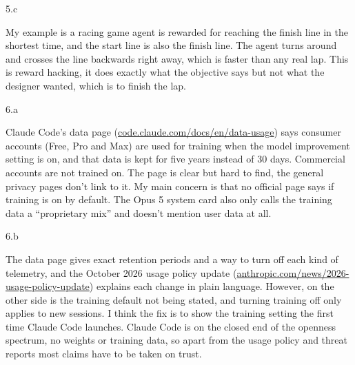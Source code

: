 \LARGE
5.c
\normalsize

\begin{answer}
  My example is a racing game agent is rewarded for reaching the finish line in the shortest time, and the start
  line is also the finish line. The agent turns around and crosses the line backwards right away,
  which is faster than any real lap. This is reward hacking, it does exactly what the objective says
  but not what the designer wanted, which is to finish the lap.
\end{answer}
\clearpage

\LARGE
6.a
\normalsize

\begin{answer}
  Claude Code's data page (\href{https://code.claude.com/docs/en/data-usage}{code.claude.com/docs/en/data-usage})
  says consumer accounts (Free, Pro and Max) are used for training when the model improvement setting
  is on, and that data is kept for five years instead of 30 days. Commercial accounts are not trained
  on. The page is clear but hard to find, the general privacy pages don't link to it. My main concern
  is that no official page says if training is on by default. The Opus 5 system card also only calls
  the training data a ``proprietary mix'' and doesn't mention user data at all.
\end{answer}

\LARGE
6.b
\normalsize

\begin{answer}
  The data page gives exact retention periods and a way to turn off each kind
  of telemetry, and the October 2026 usage policy update
  (\href{https://www.anthropic.com/news/2026-usage-policy-update}{anthropic.com/news/2026-usage-policy-update})
  explains each change in plain language. However, on the other side is the training default not being stated,
  and turning training off only applies to new sessions. I think the fix is to show the training setting
  the first time Claude Code launches. Claude Code is on the closed end of the openness spectrum, no
  weights or training data, so apart from the usage policy and threat reports most claims have to be
  taken on trust.
\end{answer}

